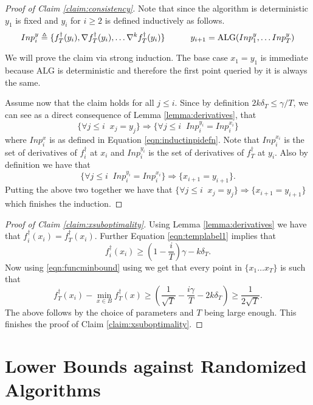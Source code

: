 \documentclass[final,12pt]{colt2018} %
\def\hardf{f^{\dagger}}
\def\alg{\mathrm{ALG}}
\begin{document}
\begin{proof}[Proof of Claim \ref{claim:consistency}]
Note that since the algorithm is deterministic $y_1$ is fixed and $y_i$ for $i \geq 2$ is defined inductively as follows. 
\begin{equation}
\label{eqn:inductivecaseproof}
  Inp^y_i \defeq \{ \hardf_T(y_i), \nabla \hardf_T(y_i), \ldots \nabla^k \hardf_T(y_i)\} \quad \quad \quad y_{i+1} = \alg(Inp^y_1, \ldots Inp^y_T)
\end{equation}

We will prove the claim via strong induction. The base case $x_1 = y_1$ is immediate because $\alg$ is deterministic and therefore the first point queried by it is always the same. 

Assume now that the claim holds for all $j \leq i$.  
Since by definition $2k\delta_T \leq \gamma/T$, we can see as a direct consequence of Lemma \ref{lemma:derivatives}, that
\begin{equation}
\label{eqn:inputequalities}
  \{\forall j \leq i \;\; x_j = y_j \} \Rightarrow \{ \forall j \leq i \;\; Inp_i^{y_i} = Inp_i^{x_i} \}  
  \end{equation}
where $Inp_i^x$ is as defined in Equation \eqref{eqn:inductinpidefn}. Note that $Inp_i^{x_i}$ is the set of derivatives of $\hardf_i$ at $x_i$ and $Inp_i^{y_i}$ is the set of derivatives of $\hardf_T$ at $y_i$. Also by definition we have that 
\[ \{ \forall j \leq i \;\; Inp_i^{y_i} = Inp_i^{x_i} \} \Rightarrow \{x_{i+1} = y_{i+1}\}.\]
Putting the above two together we have that $\{\forall j \leq i \;\; x_j = y_j \} \Rightarrow \{x_{i+1} = y_{i+1}\}$
which finishes the induction. 
\end{proof}

 
\begin{proof}[Proof of Claim \ref{claim:xsuboptimality}]
  Using Lemma \ref{lemma:derivatives} we have that $\hardf_i(x_i) = \hardf_T(x_i)$. Further Equation \eqref{eqn:templabel1} implies that 
  \[\hardf_i(x_i) \geq \left(1 - \frac{i}{T}\right)\gamma - k\delta_T.\]Now using \eqref{eqn:funcminbound} using we get that every point in $\{x_1 \ldots x_T\}$ is such that 
\[ \hardf_T(x_i) - \min_{x \in B} \hardf_T(x) \geq  \left( \frac{1}{\sqrt{T}} - \frac{i\gamma}{T} - 2k\delta_T \right)\geq \frac{1}{2\sqrt{T}}.\] 
The above follows by the choice of parameters and $T$ being large enough. This finishes the proof of Claim \ref{claim:xsuboptimality}.
\end{proof}

\section{Lower Bounds against Randomized Algorithms}
\end{document}
